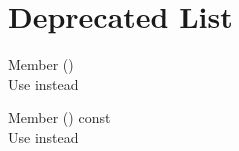 \chapter{Deprecated List}
\hypertarget{deprecated}{}\label{deprecated}

\begin{DoxyRefList}
\item[Member \doxylink{class_scene_manager_ab1c0b394adcb7956c1a02596ff47e2b5}{Scene\+Manager\+::get\+Pool} ()]\hfill \\
\label{deprecated__deprecated000001}%
%
Use  instead  
\item[Member \doxylink{class_scene_manager_a2cb1d155e23a0b4d19825625da482726}{Scene\+Manager\+::get\+Pool} () const]\hfill \\
\label{deprecated__deprecated000002}%
%
Use  instead 
\end{DoxyRefList}